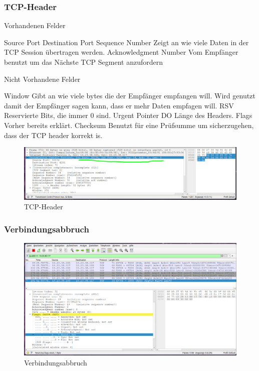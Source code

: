 \documentclass[a4paper]{article}
\begin{document}
\subsubsection{TCP-Header}
Vorhandenen Felder
\begin{outline}
	\1 Source Port
	\1 Destination Port
	\1 Sequence Number
	\2 Zeigt an wie viele Daten in der TCP Session übertragen werden.
	\1 Acknowledgment Number
	\2 Vom Empfänger benutzt um das Nächste TCP Segment anzufordern
\end{outline}
Nicht Vorhandene Felder
\begin{outline}
	\1 Window
	\2 Gibt an wie viele bytes die der Empfänger empfangen will. Wird genutzt damit der Empfänger sagen kann, dass er mehr Daten empfagen will.
	\1 RSV
	 Reservierte Bits, die immer 0 sind.
	\1 Urgent Pointer
	\1 DO
	\2 Länge des Headers.
	\1 Flags
	\2 Vorher bereits erklärt.
	\1 Checksum
	\2 Benutzt für eine Prüfsumme um sicherzugehen, dass der TCP header korrekt is.
\end{outline}
\begin{figure}[h]
	\includegraphics[scale=0.2]{images/tcp-header.jpeg}
	\caption{TCP-Header}
\end{figure}
\subsubsection{Verbindungsabbruch}
\begin{figure}[ht]
	\includegraphics[scale=0.2]{images/verbindungsabbruch.png}
	\caption{Verbindungsabbruch}
\end{figure}
\end{document}
